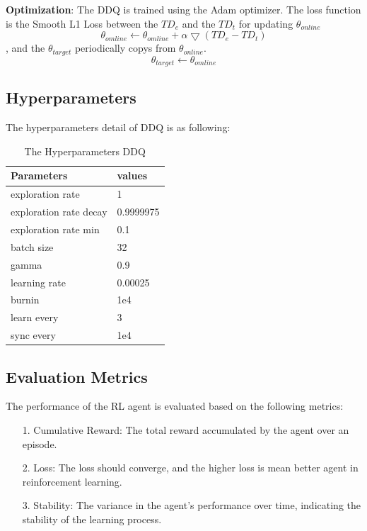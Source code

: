 \documentclass[preprint,12pt,3p,times]{elsarticle}
\begin{document}
\textbf{Optimization}: The DDQ is trained using the Adam optimizer. The loss function is the Smooth L1 Loss between the \(TD_{e}\) and the \(TD_{t}\) for updating \(\theta_{online}\)
\begin{equation*}\label{eq_kernel}
    \theta _{omline} \leftarrow \theta _{omline} + \alpha \bigtriangledown (TD_{e}-TD_{t})
\end{equation*}
, and the \(\theta_{target}\) periodically copys from \(\theta_{online}\).
\begin{equation*}\label{eq_kernel}
    \theta _{target} \leftarrow \theta _{omline}
\end{equation*}

\subsection{Hyperparameters}

The hyperparameters detail of DDQ is as following:

\begin{table}[!h]
\centering
\caption{\label{t_data_stats}The Hyperparameters DDQ}
\begin{tabular}{p{4.5cm} p{2.5cm} }
\hline
Parameters                      & values     \\ \hline
exploration rate                & 1          \\
exploration rate decay          & 0.9999975  \\
exploration rate min            & 0.1        \\
batch size                      & 32         \\
gamma                           & 0.9        \\
learning rate                   & 0.00025    \\
burnin                          & 1e4        \\
learn every                     & 3          \\
sync every                      & 1e4        \\ \hline
\end{tabular}
\end{table}

\subsection{Evaluation Metrics}
The performance of the RL agent is evaluated based on the following metrics:

\begin{enumerate}
\item [1.]Cumulative Reward: The total reward accumulated by the agent over an episode.

\item [2.]Loss: The loss should converge, and the higher loss is mean better agent in reinforcement learning.

\item [3.]Stability: The variance in the agent’s performance over time, indicating the stability of the learning process.
\end{enumerate}
\end{document}

